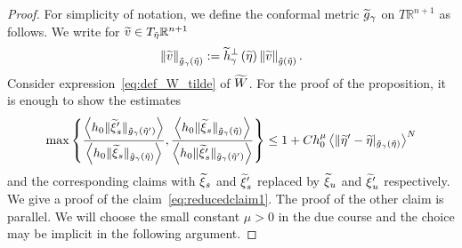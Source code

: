 \documentclass[10pt]{amsart}
\theoremstyle{definition}\newtheorem{defi}[theo]{Definition}\newtheorem{rema}[theo]{Remark}\newtheorem{exam}[theo]{Example}\newtheorem{exem}[theo]{Example}\newtheorem{nota}[theo]{Notation}
\newcommand{\bbR}{\mathbb{R}}
\let\oldtilde\tilde
\renewcommand*{\tilde}[1]{\mathchoice{\widetilde{#1}}{\widetilde{#1}}{\oldtilde{#1}}{\oldtilde{#1}}}
\begin{document}
\begin{proof}
For simplicity of notation, we define the conformal metric $\tilde{g}_{\gamma}$ on $T\bbR^{n+1}$ as follows. We write for $\tilde{v}\in T_{\tilde{\eta}}\bbR^{n+1}$
\begin{equation}\label{eq:def_gtilde}
\left\Vert \tilde{v}\right\Vert _{\tilde{g}_{\gamma}\left(\tilde{\eta}\right)}:=\tilde{h}_{\gamma}^{\perp}\left(\tilde{\eta}\right)\left\Vert \tilde{v}\right\Vert _{\tilde{g}\left(\tilde{\eta}\right)}.
\end{equation}
Consider expression~\eqref{eq:def_W_tilde} of $\tilde{W}$. For the proof of the proposition, it is enough to show the estimates
\begin{align}\label{eq:reducedclaim1}
\max\left\{ \frac{\left\langle h_{0}\|\tilde{\xi}'_{s}\|_{\tilde{g}_{\gamma}\left(\tilde{\eta}'\right)}\right\rangle}{\left\langle h_{0}\|\tilde{\xi}_{s}\|_{\tilde{g}_{\gamma}\left(\tilde{\eta}\right)}\right\rangle},\frac{\left\langle h_{0}\|\tilde{\xi}_{s}\|_{\tilde{g}_{\gamma}\left(\tilde{\eta}\right)}\right\rangle}{\left\langle h_{0}\|\tilde{\xi}'_{s}\|_{\tilde{g}_{\gamma}\left(\tilde{\eta}'\right)}\right\rangle}\right\} \le1+Ch_{0}^{\mu}\left\langle\|\tilde{\eta}'-\tilde{\eta}|_{\tilde{g}_{\gamma}\left(\tilde{\eta}\right)}\right\rangle^{N}
\end{align}
and the corresponding claims with $\tilde{\xi}_{s}$ and $\tilde{\xi}'_{s}$ replaced by $\tilde{\xi}_{u}$ and $\tilde{\xi}'_{u}$ respectively. We give a proof of the claim~\eqref{eq:reducedclaim1}. The proof of the other claim is parallel. We will choose the small constant $\mu>0$ in the due course and the choice may be implicit in the following argument.


\end{proof}
\end{document}
